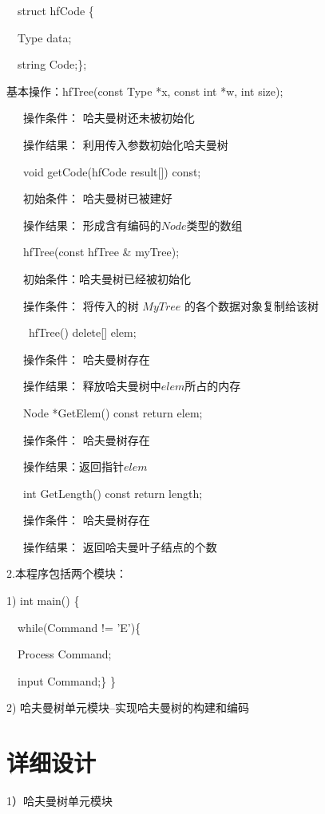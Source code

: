 \documentclass[paper=a4,UTF8,fontsize=11pt]{scrartcl} %
\numberwithin{equation}{section} %
\numberwithin{figure}{section} %
\numberwithin{table}{section} %
\begin{document}
    \qquad \qquad \ \ struct hfCode \{
        
    \qquad \qquad \ \ Type data;

    \qquad \qquad \ \ string Code;\};

基本操作：hfTree(const Type *x, const int *w, int size);

\qquad \qquad \quad \ \ \ 操作条件： 哈夫曼树还未被初始化

\qquad \qquad \quad \ \ \ 操作结果： 利用传入参数初始化哈夫曼树

\qquad \qquad \quad \ \ \ void getCode(hfCode result[]) const;

\qquad \qquad \quad \ \ \ 初始条件： 哈夫曼树已被建好

\qquad \qquad \quad \ \ \ 操作结果： 形成含有编码的$Node$类型的数组

\qquad \qquad \quad \ \ \ hfTree(const hfTree \& myTree);

\qquad \qquad \quad \ \ \ 初始条件：哈夫曼树已经被初始化

\qquad \qquad \quad \ \ \ 操作条件： 将传入的树 $MyTree$ 的各个数据对象复制给该树

\qquad \qquad \quad \ \ \  ~hfTree() { delete[] elem; }

\qquad \qquad \quad \ \ \  操作条件： 哈夫曼树存在

\qquad \qquad \quad \ \ \ 操作结果： 释放哈夫曼树中$elem$所占的内存

\qquad \qquad \quad \ \ \ Node *GetElem() const { return elem; }

\qquad \qquad \quad \ \ \ 操作条件： 哈夫曼树存在

\qquad \qquad \quad \ \ \ 操作结果：返回指针$elem$

\qquad \qquad \quad \ \ \ int GetLength() const { return length; }

\qquad \qquad \quad \ \ \ 操作条件： 哈夫曼树存在

\qquad \qquad \quad \ \ \ 操作结果： 返回哈夫曼叶子结点的个数
\vspace{0.3cm}

2.本程序包括两个模块：

1)  int main() \{

    \ \  while(Command != 'E')\{

        \ \  Process Command;

        \ \  input Command;\} \}
       
2)  哈夫曼树单元模块--实现哈夫曼树的构建和编码

\section{详细设计}
1）哈夫曼树单元模块

\end{document}

